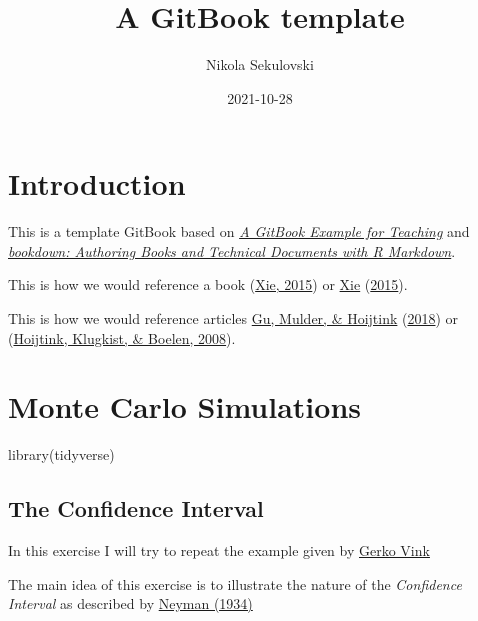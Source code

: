 \documentclass[
]{book}
\title{A GitBook template}
\author{Nikola Sekulovski}
\date{2021-10-28}
\newenvironment{Shaded}{\begin{snugshade}}{\end{snugshade}}
\newcommand{\FunctionTok}[1]{\textcolor[rgb]{0.00,0.00,0.00}{#1}}
\newcommand{\NormalTok}[1]{#1}
\begin{document}
\maketitle

{
\setcounter{tocdepth}{1}
\tableofcontents
}
\hypertarget{introduction}{%
\chapter{Introduction}\label{introduction}}

This is a template GitBook based on \href{https://cjvanlissa.github.io/gitbook-demo/}{\emph{A GitBook Example for Teaching}} and \href{https://bookdown.org/yihui/bookdown/}{\emph{bookdown: Authoring Books and Technical Documents with R Markdown}}.

This is how we would reference a book (\protect\hyperlink{ref-xie2015}{Xie, 2015}) or \protect\hyperlink{ref-xie2015}{Xie} (\protect\hyperlink{ref-xie2015}{2015}).

This is how we would reference articles \protect\hyperlink{ref-gu2018approximated}{Gu, Mulder, \& Hoijtink} (\protect\hyperlink{ref-gu2018approximated}{2018}) or (\protect\hyperlink{ref-hoijtink2008bayesian}{Hoijtink, Klugkist, \& Boelen, 2008}).

\hypertarget{monte-carlo-simulations}{%
\chapter{Monte Carlo Simulations}\label{monte-carlo-simulations}}

\begin{Shaded}
\begin{Highlighting}[]
\FunctionTok{library}\NormalTok{(tidyverse)}
\end{Highlighting}
\end{Shaded}

\hypertarget{the-confidence-interval}{%
\section{The Confidence Interval}\label{the-confidence-interval}}

In this exercise I will try to repeat the example given by \href{https://www.gerkovink.com/markup/Wk1/Solution_to_Ex1.html}{Gerko Vink}

The main idea of this exercise is to illustrate the nature of the \emph{Confidence Interval} as described by \href{http://www.stat.cmu.edu/~brian/905-2008/papers/neyman-1934-jrss.pdf}{Neyman (1934)}
\end{document}
